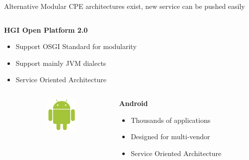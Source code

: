 \documentclass[a4paper]{beamer}
\begin{document}
\begin{frame}{Alternative Modular CPE architectures exist, new service can be pushed easily}
\begin{columns}[T]
																						
		\begin{column}[T]{0.70 \textwidth} 
																																	
																																		   
			\textbf{ HGI Open Platform 2.0}
			\begin{itemize}
				\item Support OSGI Standard for modularity
				\item Support mainly JVM dialects
				\item Service Oriented Architecture
			\end{itemize}
			\vspace{3mm}
																																		     
																																	
		\end{column}
																						
	\end{columns}
				
				
	\begin{columns}[T]
		\begin{column}{.01\textwidth} %
											
		\end{column}
		\begin{column}[T]{0.15 \textwidth} 
			\vspace{1em}
			\includegraphics[width=4em]{droid.png}
		\end{column}
																		
																						
		\begin{column}[T]{0.70 \textwidth} 
																																	
																																		   
			\textbf{ Android}
			\begin{itemize}
				\item Thousands of applications
				\item Designed for multi-vendor
				\item Service Oriented Architecture
			\end{itemize}
			\vspace{5mm}
																																		     
																																	
		\end{column}
																						
	\end{columns}
					
						
						
						
								
						
							
\end{frame}
\end{document}
